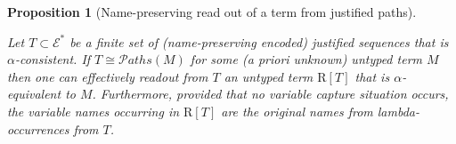 \documentclass{elsarticle}
\theoremstyle{plain}
\newtheorem{proposition}[theorem]{Proposition}
\theoremstyle{definition}
\def\structisomorphic{\cong} %
\def\readout{\mathrm{R}} %
\def\nameencoding{\mathcal{E}} %
\newcommand\pathset{{\mathcal{P}aths}} %
\begin{document}
\begin{proposition}[Name-preserving read out of a term from justified paths]
\label{proposition:termtree_readout_from_justitied_paths}

Let $T\subset \nameencoding^*$ be a finite set of (name-preserving encoded) justified sequences  that is $\alpha$-consistent.
If $T\structisomorphic \pathset(M)$ for some (a priori unknown) untyped term $M$ then one can effectively readout from $T$ an untyped
term  $\readout[T]$ that is $\alpha$-equivalent to $M$.
%
Furthermore, provided that no variable capture situation occurs, the variable names occurring in $\readout[T]$ are the original names from lambda-occurrences from $T$.
\end{proposition}
\end{document}
